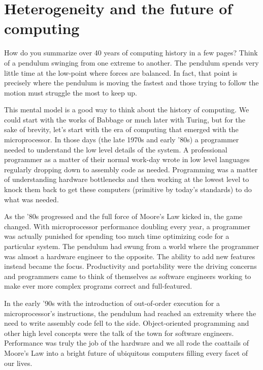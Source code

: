 
\def\ArtDir{01.HeteroComp/figures}%

\chapter{Heterogeneity and the future of computing}
\label{chapter:heterogeneity}

How do you summarize over 40 years of computing history in a few pages?   
Think of a pendulum swinging from one extreme to another.  The pendulum spends very little time at
the low-point where forces are balanced.  In fact, that point is precisely where the pendulum is
moving the fastest and those trying to follow the motion must struggle the most  to keep up.

This mental model is a good way to think about the history of computing.  We could start with the
works of Babbage or much later with Turing, but for the sake of brevity, let's start with the era of computing
that emerged with the microprocessor.  In those days (the late 1970s and early '80s) a programmer
needed to understand the low level details of the system.  A professional programmer as a matter
of their normal work-day wrote in low level languages regularly dropping down to assembly code 
as needed.   Programming was a matter of understanding hardware bottlenecks and then working at the lowest 
level to knock them back to get these computers (primitive by today's standards) to do what was needed.

As the '80s progressed and the full force of Moore's Law kicked in, the game changed.   With
microprocessor performance doubling every year, a programmer was actually punished for 
spending too much time optimizing code for a particular system.  The pendulum had swung from
a world where the programmer was almost a hardware engineer to the opposite.  The ability to 
add new features instead became the focus.  Productivity and portability were the driving concerns and
programmers came to think of themselves as software engineers working to make ever more
complex programs correct and full-featured.

In the early '90s with the introduction of out-of-order execution for a microprocessor's instructions, the 
pendulum had reached an extremity where the need to write assembly code fell to the side.  Object-oriented
programming and other high level concepts were the talk of the town for software engineers.  Performance was
truly the job of the hardware and we all rode the coattails of Moore's Law into a bright future of
ubiquitous computers filling every facet of our lives.

